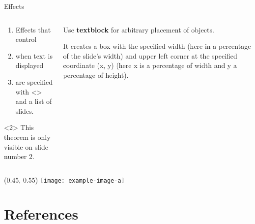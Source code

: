 \documentclass[UKenglish, aspectratio = 169]{beamer}
\begin{document}
\begin{frame}{Effects}
    \begin{columns}[onlytextwidth]
        \begin{column}{0.49\textwidth}
            \begin{enumerate}[<+-|alert@+>]
                \item
                Effects that control

                \item
                when text is displayed

                \item
                are specified with <> and a list of slides.
            \end{enumerate}

            \begin{theorem}<2>
                This theorem is only visible on slide number 2.
            \end{theorem}
        \end{column}
        \begin{column}{0.49\textwidth}
            Use \textbf<2->{textblock} for arbitrary placement of objects.

            \pause
            \medskip

            It creates a box
            with the specified width (here in a percentage of the slide's width)
            and upper left corner at the specified coordinate (x, y)
            (here x is a percentage of width and y a percentage of height).
        \end{column}
    \end{columns}
    
    {
        \begin{textblock}{0.3}(0.45, 0.55)
            \texttt{[image: example-image-a]}
        \end{textblock}
    }
\end{frame}

\section{References}
\end{document}
